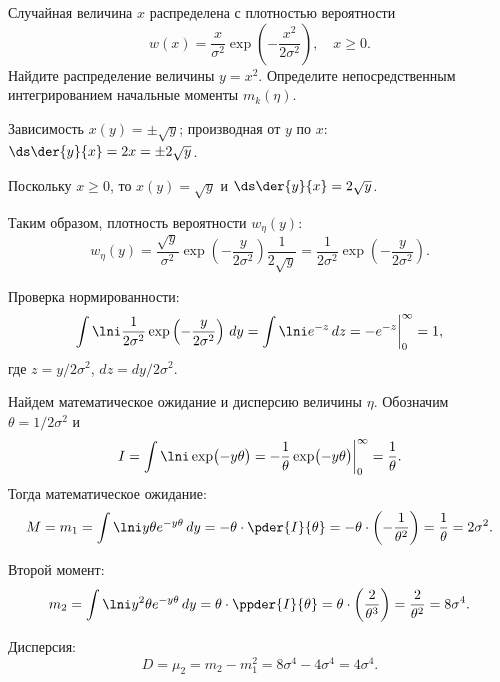 \documentclass[pscyr]{hedwork}
\begin{document}
  \begin{task}{14}{
    Случайная величина \( x \) распределена с плотностью вероятности
    \[
      w(x) = \frac{x}{\sigma^2}\exp\left(-\frac{x^2}{2\sigma^2}\right),
        \quad x \ge 0.
    \]
    Найдите распределение величины \( y = x^2 \). Определите непосредственным
    интегрированием начальные моменты \( m_k(\eta) \).    
  }
    
    Зависимость \( x(y) = \pm\sqrt{y} \); производная от \( y \) по \( x \):
    \( \ds \der{y}{x} = 2x = \pm 2\sqrt{y} \).
    
    Поскольку \( x \ge 0 \), то \( x(y) = \sqrt{y} \) и
    \( \ds \der{y}{x} = 2\sqrt{y} \).
    
    Таким образом, плотность вероятности \( w_\eta(y) \):
    \[
      w_\eta(y) = \frac{\sqrt{y}}{\sigma^2}
        \exp\left(-\frac{y}{2\sigma^2}\right)
        \frac{1}{2\sqrt{y}} =
        \frac{1}{2\sigma^2} \exp\left(-\frac{y}{2\sigma^2}\right).
    \]
    
    Проверка нормированности:
    \[
      \int\lni \frac{1}{2\sigma^2} \exp\left(-\frac{y}{2\sigma^2}\right)\,dy =
        \int\lni e^{-z}\,dz = -e^{-z}\bigg|_0^\infty = 1,
    \]
    где \( z = y / 2\sigma^2 \), \( dz = dy / 2\sigma^2 \).
    
    Найдем математическое ожидание и дисперсию величины \( \eta \). Обозначим
    \( \theta = 1 / 2\sigma^2 \) и
    \[
      I = \int\lni \exp\bigl(-y\theta\big) = -\frac{1}{\theta}
        \exp\bigl(-y\theta\big)\bigg|_0^\infty = \frac{1}{\theta}.
    \]
    Тогда математическое ожидание:
    \[
      M = m_1 = \int\lni y\theta e^{-y\theta}\,dy = -\theta\cdot\pder{I}{\theta}
        = -\theta\cdot\left(-\frac{1}{\theta^2}\right) = \frac{1}{\theta} =
        2\sigma^2.
    \]
    
    Второй момент:
    \[
      m_2 = \int\lni y^2\theta e^{-y\theta}\,dy = \theta\cdot\ppder{I}{\theta}
        = \theta\cdot\left(\frac{2}{\theta^3}\right) = \frac{2}{\theta^2} =
        8\sigma^4.
    \]
    
    Дисперсия:
    \[
      D = \mu_2 = m_2 - m_1^2 = 8\sigma^4 - 4\sigma^4 = 4\sigma^4.
    \]
    
  \end{task}
  
\end{document}
